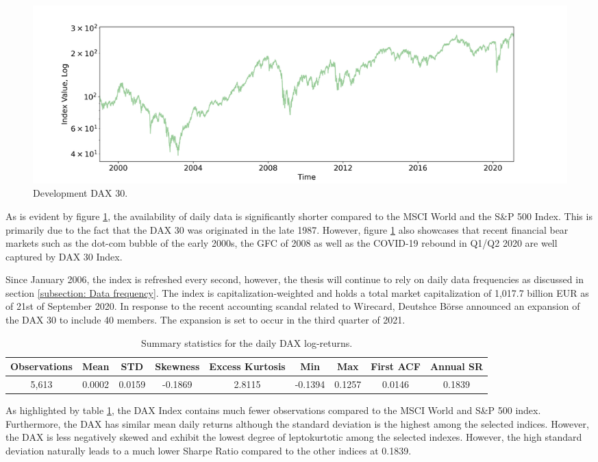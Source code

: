 \begin{figure}[H] 
    \centering
    \includegraphics[width=1\textwidth]{analysis/data_description/images/DAX_index.png}
    \caption{Development DAX 30.}
    \label{fig: DAX_index}
\end{figure}

As is evident by figure \ref{fig: DAX_index}, the availability of daily data is significantly shorter compared to the MSCI World and the S\&P 500 Index. This is primarily due to the fact that the DAX 30 was originated in the late 1987. However, figure \ref{fig: DAX_index} also showcases that recent financial bear markets such as the dot-com bubble of the early 2000s, the GFC of 2008 as well as the COVID-19 rebound in Q1/Q2 2020 are well captured by DAX 30 Index. 

Since January 2006, the index is refreshed every second, however, the thesis will continue to rely on daily data frequencies as discussed in section \ref{subsection: Data frequency}. The index is capitalization-weighted and holds a total market capitalization of 1,017.7 billion EUR as of 21st of September 2020. In response to the recent accounting scandal related to Wirecard, Deutshce Börse announced an expansion of the DAX 30 to include 40 members. The expansion is set to occur in the third quarter of 2021.

\begin{table}[H]
\caption{Summary statistics for the daily DAX log-returns.}
\centering
\begin{tabular}{c c c c c c c c c} 
\hline\hline
Observations & Mean & STD & Skewness & Excess Kurtosis & Min & Max & First ACF & Annual SR \\
\hline
5,613 & 0.0002 & 0.0159 & -0.1869 & 2.8115 & -0.1394 & 0.1257 & 0.0146 & 0.1839 \\
\hline
\end{tabular}
\label{tab:summary_stats_DAX}
\end{table}

As highlighted by table \ref{tab:summary_stats_DAX}, the DAX Index contains much fewer observations compared to the MSCI World and S\&P 500 index. Furthermore, the DAX has similar mean daily returns although the standard deviation is the highest among the selected indices. However, the DAX is less negatively skewed and exhibit the lowest degree of leptokurtotic among the selected indexes. However, the high standard deviation naturally leads to a much lower Sharpe Ratio compared to the other indices at 0.1839.


